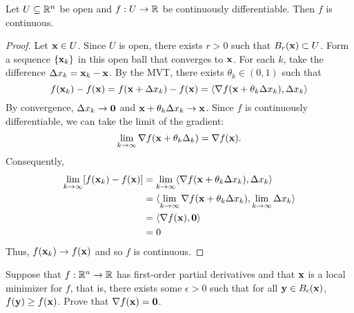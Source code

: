 \documentclass[letterpaper, twoside, 12pt]{book}
\begin{document}
\begin{theorem}[13.20]
  Let \(U\subseteq\mathbb R^n\) be open and \(f:U\to\mathbb R\) be continuously
  differentiable. Then \(f\) is continuous.
\end{theorem}

\begin{proof}
    Let \(\mathbf x \in U\). Since \(U\) is open, there exists \(r > 0\) such that
    \(B_r(\mathbf x) \subset U\). Form a sequence \(\{\mathbf x_k\}\) in this
    open ball that converges to \(\mathbf x\). For each \(k\), take the difference
    \(\Delta x_k = \mathbf x_k - \mathbf x\). By the MVT, there exists 
    \(\theta_k \in (0, 1)\) such that
    \[ f(\mathbf x_k) - f(\mathbf x) = f(\mathbf x + \Delta x_k) - f(\mathbf x) =
    \langle \nabla f(\mathbf x + \theta_k \Delta x_k), \Delta x_k \rangle \]
    By convergence, \(\Delta x_k \to \mathbf 0\) and 
    \(\mathbf x + \theta_k \Delta x_k \to \mathbf x\). Since \(f\) is continuously
    differentiable, we can take the limit of the gradient:
    \[ \lim_{k \to \infty} \nabla f(\mathbf x + \theta_k \Delta_k) = \nabla f(\mathbf x).\]
    Consequently,
    \begin{align*}
       \lim_{k \to \infty}[f(\mathbf x_k) - f(\mathbf x)] &= \lim_{k \to \infty}\langle \nabla f(\mathbf x + \theta_k \Delta x_k), \Delta x_k \rangle \\
                                                      &= \langle \lim_{k \to \infty} \nabla f(\mathbf x + \theta_k \Delta x_k), \lim_{k \to \infty} \Delta x_k \rangle \\
                                                      &= \langle \nabla f(\mathbf x), \mathbf 0 \rangle \\
                                                      &= 0 \\
    \end{align*}
    Thus, \(f(\mathbf x_k) \to f(\mathbf x)\) and so \(f\) is continuous.
\end{proof}

\begin{exercise}[4]
  Suppose that \(f:\mathbb R^n\to\mathbb R\) has first-order partial derivatives
  and that \(\mathbf x\) is a local minimizer for \(f\), that is,
  there exists some \(\epsilon>0\) such that for all
  \(\mathbf y\in B_\epsilon(\mathbf x)\), \(f(\mathbf y)\geq f(\mathbf x)\).
  Prove that \(\nabla f(\mathbf x)=\mathbf 0\).
\end{exercise}
\end{document}
